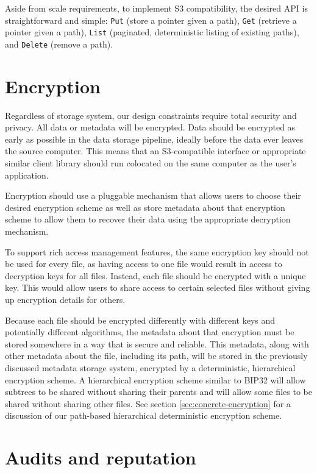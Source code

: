 \documentclass[11pt,fleqn,openany]{book}
\newcommand{\x}[1]{{\tt #1}} \newcommand{\code}[1]{{\em #1}}
\begin{document}
Aside from scale requirements, to implement S3 compatibility,
the desired API is straightforward and
simple: \x{Put} (store a pointer given a path), \x{Get} (retrieve a pointer
given a path),
\x{List} (paginated, deterministic listing of existing paths), and \x{Delete}
(remove a path).

\section{Encryption}

Regardless of storage system, our design constraints require total security
and privacy. All data or metadata will be encrypted.
Data should be encrypted as early as possible in the data storage pipeline,
ideally before the data ever leaves the source computer. This means that an
S3-compatible interface or appropriate similar client library should run
colocated on the same computer as the user's application.

Encryption should use a pluggable mechanism that allows users to choose their
desired encryption scheme as well as store metadata about that encryption
scheme to allow them to recover their data using the appropriate decryption
mechanism.

To support rich access management features, the same encryption key should not
be used for every file, as having access to one file would result in access
to decryption keys for all files. Instead, each file should be encrypted with
a unique key. This would allow users to share access to certain selected files
without giving up encryption details for others.

Because each file should be encrypted differently with different keys and
potentially different algorithms, the metadata about that encryption must
be stored somewhere in a way that is secure and reliable. This metadata,
along with other metadata about the file, including its path, will
be stored in the previously discussed metadata storage system, encrypted
by a deterministic, hierarchical encryption scheme.
A hierarchical encryption scheme similar to
BIP32 \cite{bip32} will allow subtrees to be shared without sharing their
parents and will allow some files to be shared without sharing other files.
See section \ref{sec:concrete-encryption} for a discussion of our path-based
hierarchical deterministic encryption scheme.

\section{Audits and reputation}\label{sec:framework-audits}
\end{document}
